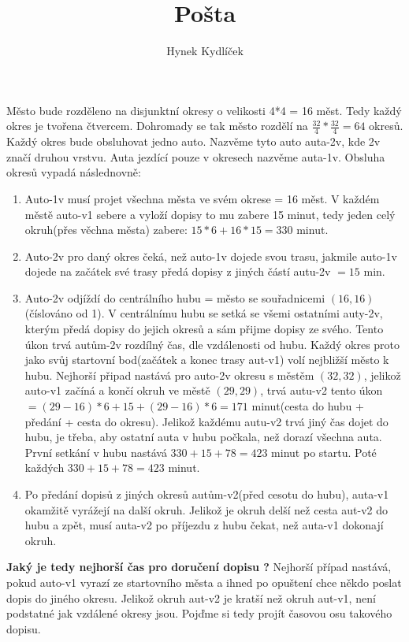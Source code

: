 \documentclass[a4paper]{article}
\title{Pošta}
\author{Hynek Kydlíček}
\begin{document}
\maketitle
Město bude rozděleno na disjunktní okresy o velikosti 4*4 = 16 měst.
Tedy každý okres je tvořena čtvercem.
Dohromady se tak město rozdělí na $\frac{32}{4} * \frac{32}{4} = 64$ okresů.
Každý okres bude obsluhovat jedno auto. 
Nazvěme tyto auto auta-2v, kde 2v značí druhou vrstvu.
Auta jezdící pouze v okresech nazvěme auta-1v.
Obsluha okresů vypadá následnovně:
\begin{enumerate}
    \item Auto-1v musí projet všechna města ve svém okrese = 16 měst.
        V každém městě auto-v1 sebere a vyloží dopisy to mu zabere 15 minut, tedy jeden celý okruh(přes věchna města) zabere: $15*6 + 16*15 = 330 $ minut.
    \item Auto-2v pro daný okres čeká, než auto-1v dojede svou trasu, jakmile auto-1v dojede na začátek své trasy předá dopisy z jiných částí autu-2v $= 15$ min.
    \item Auto-2v odjíždí do centrálního hubu = město se souřadnicemi $(16, 16)$(číslováno od 1). V centrálnímu hubu se setká se všemi ostatními auty-2v, kterým předá dopisy do jejich okresů a sám přijme dopisy ze svého. Tento úkon trvá autům-2v rozdílný čas, dle vzdálenosti od hubu. Každý okres proto jako svůj startovní bod(začátek a konec trasy aut-v1) volí nejbližší město k hubu. Nejhorší připad nastává pro auto-2v okresu s městěm $(32, 32)$, jelikož auto-v1 začíná a končí okruh ve městě $(29, 29)$, trvá autu-v2 tento úkon $= (29-16)*6 + 15 + (29-16)*6 = 171$ minut(cesta do hubu + předání + cesta do okresu). Jelikož každému autu-v2 trvá jiný čas dojet do hubu, je třeba, aby ostatní auta v hubu počkala, než dorazí všechna auta. První setkání v hubu nastává $330 + 15 + 78 = 423$ minut po startu.
        Poté každých $330 + 15 + 78 = 423$ minut.
    \item   Po předání dopisů z jiných okresů autům-v2(před cesotu do hubu), auta-v1 okamžitě vyrážejí na další okruh. Jelikož je okruh delší než cesta aut-v2 do hubu a zpět, musí auta-v2 po příjezdu z hubu čekat, než auta-v1 dokonají okruh.
\end{enumerate}

\textbf{Jaký je tedy nejhorší čas pro doručení dopisu ?} 
Nejhorší případ nastává, pokud auto-v1 vyrazí ze startovního města a ihned po opuštení chce někdo poslat dopis do jiného okresu. Jelikož okruh aut-v2 je kratší než okruh aut-v1, není podstatné jak vzdálené okresy jsou.
Pojďme si tedy projít časovou osu takového dopisu.
\end{document}
